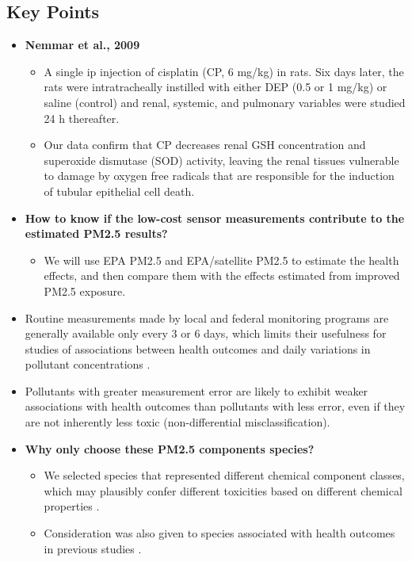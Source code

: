 \documentclass{article}
\begin{document}
\subsection{Key Points}
\begin{itemize}
    \item \textbf{Nemmar et al., 2009}{
        \begin{itemize}
            \item A single ip injection of cisplatin (CP, 6 mg/kg) in rats. Six days later, the rats were intratracheally instilled with either DEP (0.5 or 1 mg/kg) or saline (control) and renal, systemic, and pulmonary variables were studied 24 h thereafter. 
            \item Our data confirm that CP decreases renal GSH concentration and superoxide dismutase (SOD) activity, leaving the renal tissues vulnerable to damage by oxygen free radicals that are responsible for the induction of tubular epithelial cell death. 
        \end{itemize}
    }
    \item \textbf{How to know if the low-cost sensor measurements contribute to the estimated PM2.5 results?}{
        \begin{itemize}
            \item We will use EPA PM2.5 and EPA/satellite PM2.5 to estimate the health effects, and then compare them with the effects estimated from improved PM2.5 exposure.
        \end{itemize}
    }
    \item Routine measurements made by local and federal monitoring programs are generally available only every 3 or 6 days, which limits their usefulness for studies of associations between health outcomes and daily variations in pollutant concentrations \citep{sarnat2015fine}.
    \item Pollutants with greater measurement error are likely to exhibit weaker associations with health outcomes than pollutants with less error, even if they are not inherently less toxic (non-differential misclassification).
    \item \textbf{Why only choose these PM2.5 components species?} {
        \begin{itemize}
            \item We selected species that represented different chemical component classes, which may plausibly confer different toxicities based on different chemical properties \citep{suh2011chemical}. 
            \item Consideration was also given to species associated with health outcomes in previous studies \citep{chen2009effects, kelly2012size, rohr2012attributing}.

\end{itemize}}
\end{itemize}
\end{document}
